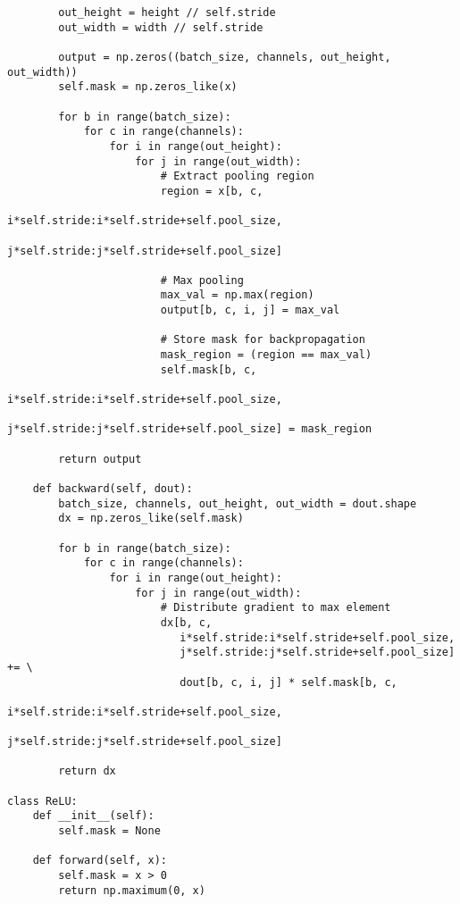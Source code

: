 ﻿\documentclass[12pt,a4paper]{article}
\begin{document}
\begin{lstlisting}
        out_height = height // self.stride
        out_width = width // self.stride
        
        output = np.zeros((batch_size, channels, out_height, out_width))
        self.mask = np.zeros_like(x)
        
        for b in range(batch_size):
            for c in range(channels):
                for i in range(out_height):
                    for j in range(out_width):
                        # Extract pooling region
                        region = x[b, c, 
                                 i*self.stride:i*self.stride+self.pool_size,
                                 j*self.stride:j*self.stride+self.pool_size]
                        
                        # Max pooling
                        max_val = np.max(region)
                        output[b, c, i, j] = max_val
                        
                        # Store mask for backpropagation
                        mask_region = (region == max_val)
                        self.mask[b, c, 
                                i*self.stride:i*self.stride+self.pool_size,
                                j*self.stride:j*self.stride+self.pool_size] = mask_region
        
        return output
    
    def backward(self, dout):
        batch_size, channels, out_height, out_width = dout.shape
        dx = np.zeros_like(self.mask)
        
        for b in range(batch_size):
            for c in range(channels):
                for i in range(out_height):
                    for j in range(out_width):
                        # Distribute gradient to max element
                        dx[b, c, 
                           i*self.stride:i*self.stride+self.pool_size,
                           j*self.stride:j*self.stride+self.pool_size] += \
                           dout[b, c, i, j] * self.mask[b, c, 
                                                       i*self.stride:i*self.stride+self.pool_size,
                                                       j*self.stride:j*self.stride+self.pool_size]
        
        return dx

class ReLU:
    def __init__(self):
        self.mask = None
    
    def forward(self, x):
        self.mask = x > 0
        return np.maximum(0, x)
    

\end{lstlisting}
\end{document}

